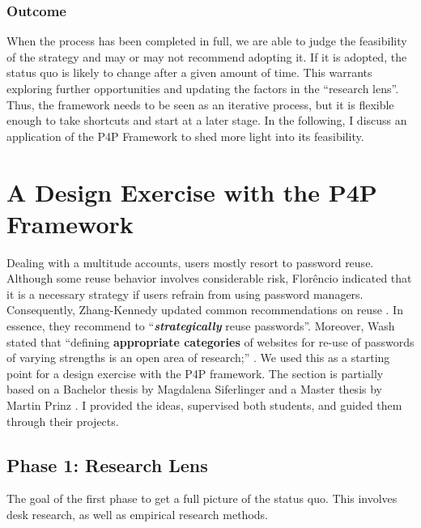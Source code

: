 \subsubsection{Outcome}
When the process has been completed in full, we are able to judge the feasibility of the strategy and may or may not recommend adopting it. If it is adopted, the status quo is likely to change after a given amount of time. This warrants exploring further opportunities and updating the factors in the ``research lens''. Thus, the framework needs to be seen as an iterative process, but it is flexible enough to take shortcuts and start at a later stage. In the following, I discuss an application of the P4P Framework to shed more light into its feasibility. 


\section{A Design Exercise with the P4P Framework}
Dealing with a multitude accounts, users mostly resort to password reuse. Although some reuse behavior involves considerable risk, Florêncio \etal indicated that it is a necessary strategy if users refrain from using password managers. Consequently, Zhang-Kennedy \etal updated common recommendations on reuse  \cite{ZhangKennedy2016RevisitingPasswordRules}. In essence, they recommend to ``\textit{\textbf{strategically}} reuse passwords''. Moreover, Wash \etal stated that ``defining \textbf{appropriate categories} of websites for re-use of passwords of varying strengths is an open area of research;'' \cite{Wash2016UnderstandingPasswordChoices}. We used this as a starting point for a design exercise with the P4P framework. The section is partially based on a Bachelor thesis by Magdalena Siferlinger \cite{Siferlinger2017BAThesis} and a Master thesis by Martin Prinz \cite{Prinz2017Thesis}. I provided the ideas, supervised both students, and guided them through their projects.

\subsection{Phase 1: Research Lens}
The goal of the first phase to get a full picture of the status quo. This involves desk research, as well as empirical research methods. 

